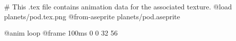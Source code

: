 # This .tex file contains animation data for the associated texture.
@load planets/pod.tex.png
@from-aseprite planets/pod.aseprite

@anim loop
	@frame 100ms 0 0 32 56
